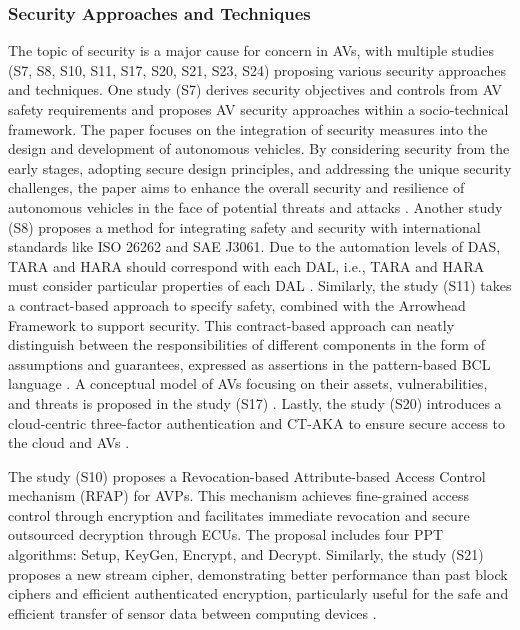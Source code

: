 \documentclass[a4paper,12pt]{article}
\begin{document}
\subsubsection{Security Approaches and Techniques}
\hspace{5mm} The topic of security is a major cause for concern in AVs, with multiple studies (S7, S8, S10, S11, S17, S20, S21, S23, S24) proposing various security approaches and techniques. One study (S7) derives security objectives and controls from AV safety requirements and proposes AV security approaches within a socio-technical framework. The paper focuses on the integration of security measures into the design and development of autonomous vehicles. By considering security from the early stages, adopting secure design principles, and addressing the unique security challenges, the paper aims to enhance the overall security and resilience of autonomous vehicles in the face of potential threats and attacks \cite{s7}. Another study (S8) proposes a method for integrating safety and security with international standards like ISO 26262 and SAE J3061. Due to the automation levels of DAS, TARA and HARA should correspond with each DAL, i.e., TARA and HARA must consider particular properties of each DAL \cite{s8}. Similarly, the study (S11) takes a contract-based approach to specify safety, combined with the Arrowhead Framework to support security. This contract-based approach can neatly distinguish between the responsibilities of different components in the form of assumptions and guarantees, expressed as assertions in the pattern-based BCL language \cite{s11}. A conceptual model of AVs focusing on their assets, vulnerabilities, and threats is proposed in the study (S17) \cite{s17}. Lastly, the study (S20) introduces a cloud-centric three-factor authentication and CT-AKA to ensure secure access to the cloud and AVs \cite{s20}.\par
The study (S10) proposes a Revocation-based Attribute-based Access Control mechanism (RFAP) for AVPs. This mechanism achieves fine-grained access control through encryption and facilitates immediate revocation and secure outsourced decryption through ECUs. The proposal includes four PPT algorithms: Setup, KeyGen, Encrypt, and Decrypt. Similarly, the study (S21) proposes a new stream cipher, demonstrating better performance than past block ciphers and efficient authenticated encryption, particularly useful for the safe and efficient transfer of sensor data between computing devices \cite{s10}.\par
\end{document}
